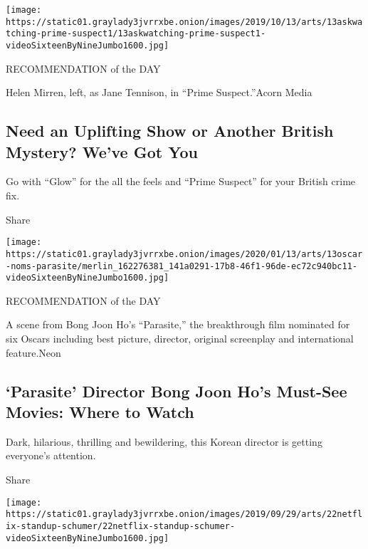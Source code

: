 \href{https://www.nytimes3xbfgragh.onion/2019/10/09/arts/television/watching-british-mysteries.html}{}

\texttt{[image: https://static01.graylady3jvrrxbe.onion/images/2019/10/13/arts/13askwatching-prime-suspect1/13askwatching-prime-suspect1-videoSixteenByNineJumbo1600.jpg]}

RECOMMENDATION of the DAY

Helen Mirren, left, as Jane Tennison, in ``Prime Suspect.''Acorn Media

\hypertarget{need-an-uplifting-show-or-another-british-mystery-weve-got-you}{%
\subsection{Need an Uplifting Show or Another British Mystery? We've Got
You}\label{need-an-uplifting-show-or-another-british-mystery-weve-got-you}}

Go with ``Glow'' for the all the feels and ``Prime Suspect'' for your
British crime fix.

Share

\href{https://www.nytimes3xbfgragh.onion/article/bong-joon-ho-movies.html}{}

\texttt{[image: https://static01.graylady3jvrrxbe.onion/images/2020/01/13/arts/13oscar-noms-parasite/merlin\_162276381\_141a0291-17b8-46f1-96de-ec72c940bc11-videoSixteenByNineJumbo1600.jpg]}

RECOMMENDATION of the DAY

A scene from Bong Joon Ho's ``Parasite,'' the breakthrough film
nominated for six Oscars including best picture, director, original
screenplay and international feature.Neon

\hypertarget{parasite-director-bong-joon-hos-must-see-movies-where-to-watch}{%
\subsection{`Parasite' Director Bong Joon Ho's Must-See Movies: Where to
Watch}\label{parasite-director-bong-joon-hos-must-see-movies-where-to-watch}}

Dark, hilarious, thrilling and bewildering, this Korean director is
getting everyone's attention.

Share

\href{https://www.nytimes3xbfgragh.onion/2019/05/21/arts/television/netflix-comedy-specials.html}{}

\texttt{[image: https://static01.graylady3jvrrxbe.onion/images/2019/09/29/arts/22netflix-standup-schumer/22netflix-standup-schumer-videoSixteenByNineJumbo1600.jpg]}

